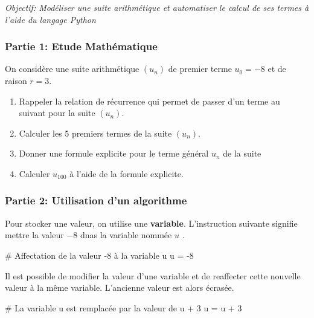 \documentclass[11pt, a4paper]{report}
\begin{document}
\def\level{Premiere}  %
\def\course{Maths}
\def\chaptername{Suites Arithmétiques} %
\def\docname{\quad}        %

\pagestyle{DS_LP}

\emph{Objectif: Modéliser une suite arithmétique et automatiser le calcul de ses termes à l'aide du langage Python}

\subsubsection{Partie 1: Etude Mathématique}

On considère une suite arithmétique $(u_n)$ de premier terme $u_0=-8$ et de raison $r=3$.

\begin{enumerate}
    \item Rappeler la relation de récurrence qui permet de passer d'un terme au suivant pour la suite $(u_n)$.
    \item Calculer les 5 premiers termes de la suite $(u_n)$.
    \item Donner une formule explicite pour le terme général $u_n$ de la suite
    \item Calculer $u_{100}$ à l'aide de la formule explicite.
\end{enumerate}

\subsubsection{Partie 2: Utilisation d'un algorithme}

\begin{easybox}
 
    Pour stocker une valeur, on utilise une \textbf{variable}. L'instruction suivante signifie \og{} mettre la valeur $-8$ dnas la variable nommée $u$ \fg{}.


    \begin{CodePythontexAlt}[TaillePolice = \large, Largeur=17cm,Centre,PremLigne=1]{}
        # Affectation de la valeur -8 à la variable u
        u = -8
        \end{CodePythontexAlt}

        Il est possible de modifier la valeur d'une variable et de reaffecter cette nouvelle valeur à la même variable. L'ancienne valeur est alors écrasée.

        
    \begin{CodePythontexAlt}[TaillePolice = \large, Largeur=17cm,Centre,PremLigne=1]{}
        # La variable u est remplacée par la valeur de u + 3
        u = u + 3
            
    \end{CodePythontexAlt}
\end{easybox}
\end{document}
